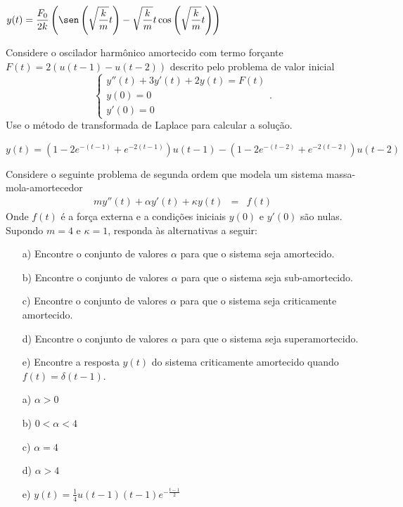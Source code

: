 \begin{resp}
$\displaystyle y(t)=\frac{F_0}{2k}\left(\sen\left(\sqrt{\frac{k}{m}}t\right)-\sqrt{\frac{k}{m}}t\cos\left(\sqrt{\frac{k}{m}}t\right)\right)$
\end{resp}


\begin{exer}Considere o oscilador harmônico amortecido com termo forçante $F(t)=2(u(t-1)-u(t-2))$ descrito pelo problema de valor inicial
\begin{equation}\left\{
\begin{array}{l}
 y''(t)+3y'(t)+2y(t)=F(t)\\
 y(0)=0\\
 y'(0)=0
\end{array}
\right..
\end{equation}
Use o método de transformada de Laplace para calcular a solução.
\end{exer}
\begin{resp}
$\displaystyle y(t)=(1-2e^{-(t-1)}+e^{-2(t-1)})u(t-1)-(1-2e^{-(t-2)}+e^{-2(t-2)})u(t-2)$
\end{resp}
\begin{exer}
 Considere o seguinte problema de segunda ordem que modela um sistema massa-mola-amortecedor
\begin{eqnarray*}
 m y''(t) +\alpha y'(t) + \kappa y(t) &=& f(t)
 \end{eqnarray*}
Onde $f(t)$ é a força externa e a condições iniciais $y(0)$ e $y'(0)$ são nulas.
 Supondo $m=4$ e $\kappa=1$, responda às alternativas a seguir:
 \begin{itemize}
  \item [a)] Encontre o conjunto de valores $\alpha$ para que o sistema seja amortecido.
  \item [b)] Encontre o conjunto de valores $\alpha$ para que o sistema seja sub-amortecido.
  \item [c)] Encontre o conjunto de valores $\alpha$ para que o sistema seja criticamente amortecido.
  \item [d)] Encontre o conjunto de valores $\alpha$ para que o sistema seja superamortecido. 
  \item [e)] Encontre a resposta $y(t)$ do sistema criticamente amortecido quando $f(t)=\delta(t-1)$.
 \end{itemize}
\end{exer}
\begin{resp}
 \begin{itemize}
  \item [a)] $\alpha>0$
  \item [b)] $0<\alpha<4$
  \item [c)] $\alpha=4$
  \item [d)] $\alpha>4$
  \item [e)] $y(t)=\frac{1}{4} u(t-1) (t-1) e^{-\frac{t-1}{2}}$
 \end{itemize}
\end{resp}
